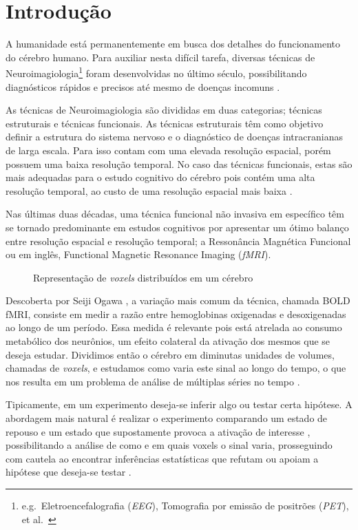 \documentclass[11pt,a4paper]{report}
\begin{document}

\titleGP
\newpage
\section*{Introdução}
A humanidade está permanentemente em busca dos detalhes do funcionamento do cérebro humano. Para auxiliar nesta difícil tarefa, diversas técnicas de Neuroimagiologia\footnote{e.g.\ Eletroencefalografia (\emph{EEG}), Tomografia por emissão de positrões (\emph{PET}), et al.\ } foram desenvolvidas no último século, possibilitando diagnósticos rápidos e precisos até mesmo de doenças incomuns \cite{larsen2009granulomatous} \cite{leung1990ct} \cite{newburger2004diagnosis}.

As técnicas de Neuroimagiologia são divididas em duas categorias; técnicas estruturais e técnicas funcionais. As técnicas estruturais têm como objetivo definir a estrutura do sistema nervoso e o diagnóstico de doenças intracranianas de larga escala. Para isso contam com uma elevada resolução espacial, porém possuem uma baixa resolução temporal. No caso das técnicas funcionais, estas são mais adequadas para o estudo cognitivo do cérebro pois contém uma alta resolução temporal, ao custo de uma resolução espacial mais baixa \cite{faro2010bold}.


Nas últimas duas décadas, uma técnica funcional não invasiva em específico têm se tornado predominante em estudos cognitivos por apresentar um ótimo balanço entre resolução espacial e resolução temporal; a Ressonância Magnética Funcional ou em inglês, Functional Magnetic Resonance Imaging (\emph{fMRI}). 
\begin{figure}[htpb]
  \centering
  
  \caption{Representação de \emph{voxels} distribuídos em um cérebro}
  \label{fig:1}
\end{figure}

Descoberta por Seiji Ogawa \cite{ogawa1990brain}, a variação mais comum da técnica, chamada BOLD fMRI, consiste em medir a razão entre hemoglobinas oxigenadas e desoxigenadas ao longo de um período. Essa medida é relevante pois está atrelada ao consumo metabólico dos neurônios, um efeito colateral da ativação dos mesmos que se deseja estudar. Dividimos então o cérebro em diminutas unidades de volumes, chamadas de \emph{voxels}, e estudamos como varia este sinal ao longo do tempo, o que nos resulta em um problema de análise de múltiplas séries no tempo \cite{friston1996movement} .

Tipicamente, em um experimento deseja-se inferir algo ou testar certa hipótese. A abordagem mais natural é realizar o experimento comparando um estado de repouso e um estado que supostamente provoca a ativação de interesse \cite{cabeza2000imaging}, possibilitando a análise de como e em quais voxels o sinal varia, prosseguindo com cautela ao encontrar inferências estatísticas que refutam ou apoiam a hipótese que deseja-se testar \cite{zarahn1997empirical}.
\end{document}
